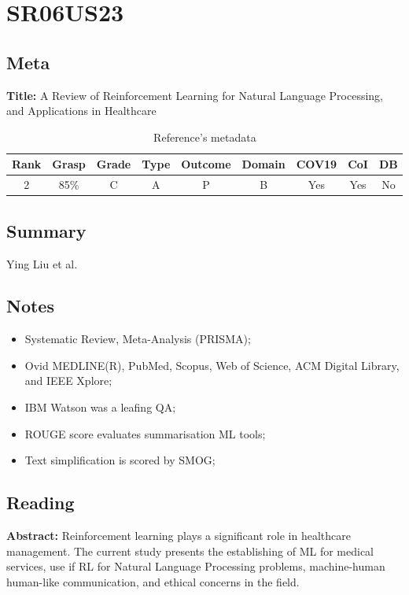 \section{ SR06US23 }


\subsection{Meta}

    \textbf{Title:}
    A Review of Reinforcement Learning for Natural Language Processing, and Applications in Healthcare

    \begin{table}[H]
        \centering
        \begin{tabular}{|c|c|c|c|c|c|c|c|c|}
            \hline
                \textbf{Rank} & \textbf{Grasp} & \textbf{Grade} & \textbf{Type} & \textbf{Outcome} & \textbf{Domain} & \textbf{COV19} & \textbf{CoI} & \textbf{DB} \\
            \hline
                2 & 85\% & C & A & P & B & Yes & Yes & No \\
            \hline
        \end{tabular}
        \caption{Reference's metadata}
        \label{tab:SR06US23}
    \end{table}

\subsection{Summary}
    Ying Liu et al. \cite{x090}

\subsection{Notes}
    \begin{itemize}
        \item Systematic Review, Meta-Analysis (PRISMA);
        \item Ovid MEDLINE(R), PubMed, Scopus, Web of Science, ACM Digital Library, and IEEE Xplore; 
        \item IBM Watson was a leafing QA;
        \item ROUGE score evaluates summarisation ML tools;
        \item Text simplification is scored by SMOG;
    \end{itemize}


\subsection{Reading}
    \textbf{Abstract:}
    Reinforcement learning plays a significant role in healthcare management. The current study presents the establishing of ML for medical services, use if RL for Natural Language Processing problems, machine-human human-like communication, and ethical concerns in the field.
    
